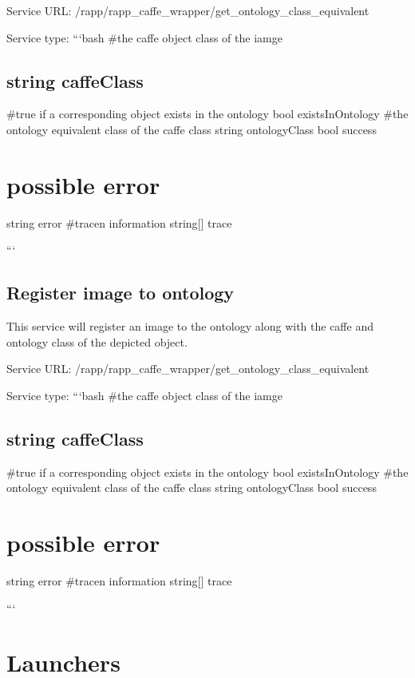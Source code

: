 Service U\-R\-L\-: {\ttfamily /rapp/rapp\-\_\-caffe\-\_\-wrapper/get\-\_\-ontology\-\_\-class\-\_\-equivalent}

Service type\-: ```bash \#the caffe object class of the iamge \subsection*{string caffe\-Class }

\#true if a corresponding object exists in the ontology bool exists\-In\-Ontology \#the ontology equivalent class of the caffe class string ontology\-Class bool success \section*{possible error}

string error \#tracen information string\mbox{[}\mbox{]} trace

```

\subsection*{Register image to ontology}

This service will register an image to the ontology along with the caffe and ontology class of the depicted object.

Service U\-R\-L\-: {\ttfamily /rapp/rapp\-\_\-caffe\-\_\-wrapper/get\-\_\-ontology\-\_\-class\-\_\-equivalent}

Service type\-: ```bash \#the caffe object class of the iamge \subsection*{string caffe\-Class }

\#true if a corresponding object exists in the ontology bool exists\-In\-Ontology \#the ontology equivalent class of the caffe class string ontology\-Class bool success \section*{possible error}

string error \#tracen information string\mbox{[}\mbox{]} trace

```

\section*{Launchers}

